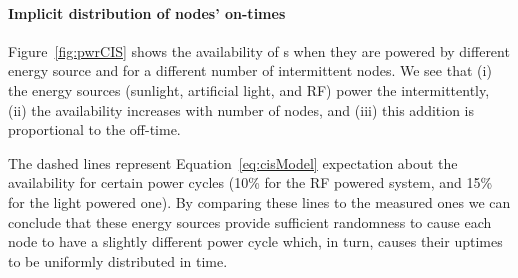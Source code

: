 \paragraph{Implicit distribution of nodes' on-times}
Figure~\ref{fig:pwrCIS} shows the availability of \sys{}s when they are powered by different energy source and for a different number of intermittent nodes. We see that (i) the energy sources (sunlight, artificial light, and RF) power the \sys intermittently, (ii) the \sys availability increases with number of nodes, and (iii) this addition is proportional to the \sys off-time. 

The dashed lines represent Equation~\ref{eq:cisModel} expectation about the \sys availability for certain power cycles (10\% for the RF powered system, and 15\% for the light powered one). By comparing these lines to the measured ones we can conclude that these energy sources provide sufficient randomness to cause each node to have a slightly different power cycle which, in turn, causes their uptimes to be uniformly distributed in time.  


